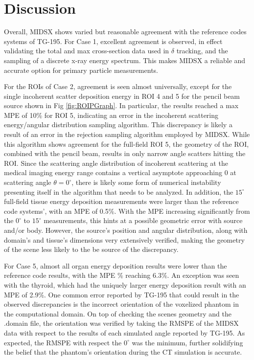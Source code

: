 \newpage
\section{Discussion}
\par Overall, MIDSX shows varied but reasonable agreement with the reference codes systems of TG-195. For Case 1, excellent agreement is observed, in effect validating the total and max cross-section data used in $\delta$ tracking, and the sampling of a discrete x-ray energy spectrum. This makes MIDSX a reliable and accurate option for primary particle measurements.

\par For the ROIs of Case 2, agreement is seen almost universally, except for the single incoherent scatter deposition energy in ROI 4 and 5 for the pencil beam source shown in Fig \ref{fig:ROIPGraph}. In particular, the results reached a max MPE of 10\% for ROI 5, indicating an error in the incoherent scattering energy/angular distribution sampling algorithm. This discrepancy is likely a result of an error in the rejection sampling algorithm employed by MIDSX. While this algorithm shows agreement for the full-field ROI 5, the geometry of the ROI, combined with the pencil beam, results in only narrow angle scatters hitting the ROI. Since the scattering angle distribution of incoherent scattering at the medical imaging energy range contains a vertical asymptote approaching 0 at scattering angle $\theta = 0^\circ$, there is likely some form of numerical instability presenting itself in the algorithm that needs to be analyzed. In addition, the $15^\circ$ full-field tissue energy deposition measurements were larger than the reference code systems', with an MPE of 0.5\%. With the MPE increasing significantly from the $0^\circ$ to $15^\circ$ measurements, this hints at a possible geometric error with source and/or body. However, the source's position and angular distribution, along with domain's and tissue's dimensions very extensively verified, making the geometry of the scene less likely to the be source of the discrepancy.

\par For Case 5, almost all organ energy deposition results were lower than the reference code results, with the MPE \% reaching 6.3\%. An exception was seen with the thyroid, which had the uniquely larger energy deposition result with an MPE of 2.9\%. One common error reported by TG-195 that could result in the observed discrepancies is the incorrect orientation of the voxelized phantom in the computational domain. On top of checking the scenes geometry and the .domain file, the orientation was verified by taking the RMSPE of the MIDSX data with respect to the results of each simulated angle reported by TG-195. As expected, the RMSPE with respect the $0^\circ$ was the minimum, further solidifying the belief that the phantom's orientation during the CT simulation is accurate.

